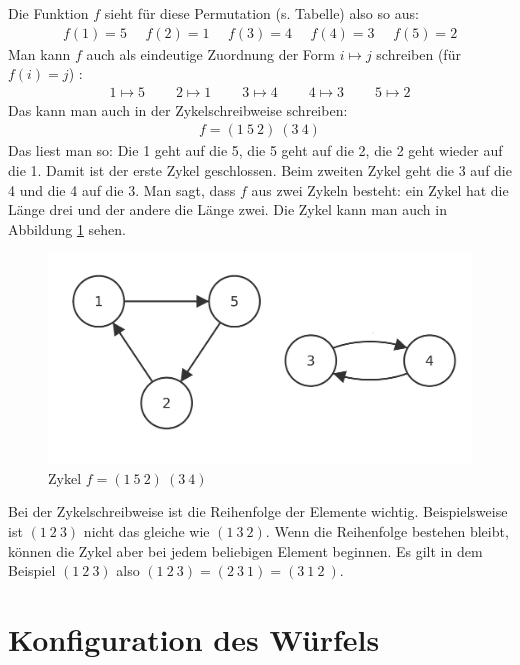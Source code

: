 \documentclass[12pt,a4paper, usenames, dvipsnames]{article}
\theoremstyle{mystyle}
\theoremstyle{definition}
\begin{document}
Die Funktion $f$ sieht für diese Permutation (s. Tabelle) also so aus:
\begin{align*}
f(1) = 5 \ \ \ \ \ \  f(2) = 1 \ \ \ \ \ \ f(3) = 4 \ \ \ \ \ \ f(4) = 3 \ \ \ \ \ \ f(5) = 2 
\end{align*}
Man kann $f$ auch als eindeutige Zuordnung der Form $i \mapsto j$ schreiben (für $f(i)=j$) \cite{JC}:
\begin{align*}
1 \mapsto 5 \ \ \ \ \ \ \ \ \ \  2\mapsto 1 \ \ \ \ \ \ \ \ \ \ 3\mapsto 4 \ \ \ \ \ \ \ \ \ \ 4\mapsto 3 \ \ \ \ \ \ \ \ \ \ 5\mapsto 2 
\end{align*}
Das kann man auch in der Zykelschreibweise schreiben:
\begin{align*}
f = (1 \ 5 \ 2)\ (3 \ 4)
\end{align*}
Das liest man so: Die 1 geht auf die 5, die 5 geht auf die 2, die 2 geht wieder auf die 1. Damit ist der erste Zykel geschlossen. Beim zweiten Zykel geht die 3 auf die 4 und die 4 auf die 3. Man sagt, dass $f$ aus zwei Zykeln besteht: ein Zykel hat die Länge drei und der andere die Länge zwei. Die Zykel kann man auch in Abbildung \ref{10} sehen.
\begin{figure}[H]
\centering
\includegraphics[scale=0.13]{Zykel_152.png}
\caption{Zykel $f = (1 \ 5 \ 2)\ (3 \ 4)$}
\label{10}
\end{figure}
Bei der Zykelschreibweise ist die Reihenfolge der Elemente wichtig. Beispielsweise ist $(1 \ 2 \ 3)$ nicht das gleiche wie $(1 \ 3 \ 2)$. Wenn die Reihenfolge bestehen bleibt, können die Zykel aber bei jedem beliebigen Element beginnen. Es gilt in dem Beispiel $(1 \ 2 \ 3)$ also $(1 \ 2 \ 3) = (2 \ 3 \ 1) = (3\ 1 \ 2 \ )$.


%
%
%
%
%
%
%
%
%
%
\newpage

\section{Konfiguration des Würfels}
\end{document}

